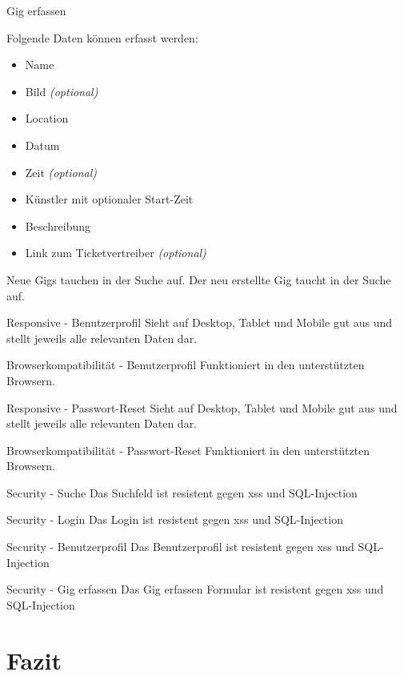 \clearpage

\acceptancetest
{Gig erfassen}
{Folgende Daten können erfasst werden:
  \begin{itemize}
    \tightlist{}
    \item{} Name
    \item{} Bild \textit{(optional)}
    \item{} Location
    \item{} Datum
    \item{} Zeit \textit{(optional)}
    \item{} Künstler mit optionaler Start-Zeit
    \item{} Beschreibung
    \item{} Link zum Ticketvertreiber \textit{(optional)}
  \end{itemize}}

\acceptancetest
{Neue Gigs tauchen in der Suche auf.}
{Der neu erstellte Gig taucht in der Suche auf.}

\clearpage

\acceptancetest
{Responsive - Benutzerprofil}
{Sieht auf Desktop, Tablet und Mobile gut aus und stellt jeweils alle relevanten Daten dar.}

\acceptancetest
{Browserkompatibilität - Benutzerprofil}
{Funktioniert in den unterstützten Browsern.}

\clearpage

\acceptancetest
{Responsive - Passwort-Reset}
{Sieht auf Desktop, Tablet und Mobile gut aus und stellt jeweils alle relevanten Daten dar.}

\acceptancetest
{Browserkompatibilität - Passwort-Reset}
{Funktioniert in den unterstützten Browsern.}

\clearpage

\acceptancetest
{Security - Suche}
{Das Suchfeld ist resistent gegen \acrshort{xss} und SQL-Injection}

\acceptancetest
{Security - Login}
{Das Login ist resistent gegen \acrshort{xss} und SQL-Injection}

\clearpage

\acceptancetest
{Security - Benutzerprofil}
{Das Benutzerprofil ist resistent gegen \acrshort{xss} und SQL-Injection}

\acceptancetest
{Security - Gig erfassen}
{Das Gig erfassen Formular ist resistent gegen \acrshort{xss} und SQL-Injection}

\clearpage
\section{Fazit}\label{konzept-fazit}

